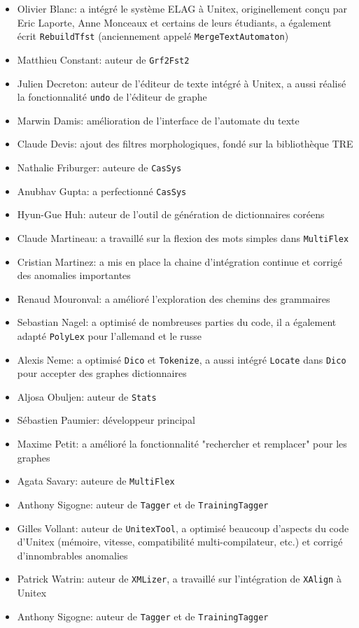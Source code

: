 \begin{itemize}                   
    \item Olivier Blanc: a intégré le système ELAG à Unitex, originellement conçu par Eric Laporte,
    Anne Monceaux et certains de leurs étudiants, a également écrit \verb+RebuildTfst+ (anciennement
     appelé \verb+MergeTextAutomaton+)
    \item Matthieu Constant: auteur de \verb+Grf2Fst2+
    \item Julien Decreton: auteur de l'éditeur de texte intégré à Unitex,
    	    a aussi réalisé la fonctionnalité \verb+undo+ de l'éditeur de graphe
    \item Marwin Damis: amélioration de l'interface de l'automate du texte
    \item Claude Devis: ajout des filtres morphologiques, fondé sur la bibliothèque TRE
    \item Nathalie Friburger: auteure de \verb+CasSys+
    \item Anubhav Gupta: a perfectionné \verb+CasSys+
    \item Hyun-Gue Huh: auteur de l'outil de génération de dictionnaires coréens
    \item Claude Martineau: a travaillé sur la flexion des mots simples dans \verb+MultiFlex+
    \item Cristian Martinez: a mis en place la chaine d'intégration continue et corrigé des anomalies
    importantes
    \item  Renaud Mouronval: a amélioré l'exploration des chemins des grammaires
    \item Sebastian Nagel: a optimisé de nombreuses parties du code, il a également adapté
    	    \verb+PolyLex+ pour l'allemand et le russe
    \item Alexis Neme: a optimisé \verb+Dico+ et \verb+Tokenize+, a aussi intégré \verb+Locate+
    dans \verb+Dico+ pour accepter des graphes dictionnaires
     \item Aljosa Obuljen: auteur de \verb+Stats+
     \item Sébastien Paumier: développeur principal
    \item Maxime Petit: a amélioré la fonctionnalité "rechercher et remplacer" pour les graphes
     \item Agata Savary: auteure de \verb+MultiFlex+
    \item Anthony Sigogne: auteur de \verb+Tagger+ et de \verb+TrainingTagger+
    \item Gilles Vollant: auteur de \verb+UnitexTool+, a optimisé beaucoup
    	    d'aspects du code d'Unitex (mémoire, vitesse, compatibilité multi-compilateur, etc.) et corrigé
    	    d'innombrables anomalies
    \item Patrick Watrin: auteur de \verb+XMLizer+, a travaillé sur l'intégration de \verb+XAlign+ à Unitex
    \item Anthony Sigogne: auteur de \verb+Tagger+ et de \verb+TrainingTagger+
\end{itemize}

